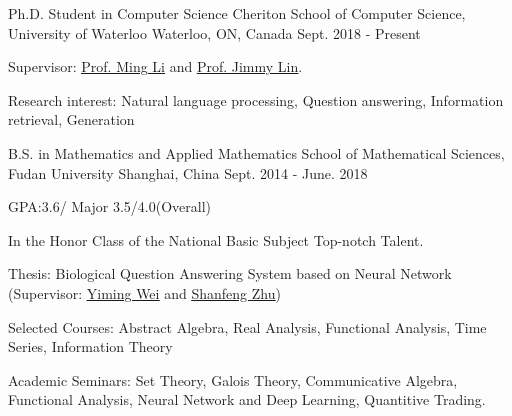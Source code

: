 

\begin{cventries}

 \cventry
    {Ph.D. Student in Computer Science} %
    {Cheriton School of Computer Science, University of Waterloo} %
    {Waterloo, ON, Canada} %
    {Sept. 2018 - Present} %
    {
      \begin{cvitems} %
        \item {Supervisor: {\href{https://cs.uwaterloo.ca/~mli/}{\underline{Prof. Ming Li}}} and {\href{https://cs.uwaterloo.ca/~jimmylin/}{\underline{Prof. Jimmy Lin}}}.}
        \item {Research interest: Natural language processing, Question answering, Information retrieval, Generation }
      \end{cvitems}
    }
      \cventry
    {B.S. in Mathematics and Applied Mathematics} %
    {School of Mathematical Sciences, Fudan University} %
    {Shanghai, China} %
    {Sept. 2014 - June. 2018} %
    {
      \begin{cvitems} %
      \item{GPA:3.6/ Major 3.5/4.0(Overall)}
      \item {In the Honor Class of the National Basic Subject Top-notch Talent.}
      \item{Thesis: Biological Question Answering System based on Neural Network (Supervisor: {\href{http://math.fudan.edu.cn/en/Data/View/222}{\underline{Yiming Wei}}} and {\href{https://dblp.org/pers/hd/z/Zhu:Shanfeng}{\underline{Shanfeng Zhu}}})}
      \item{Selected Courses: Abstract Algebra, Real Analysis, Functional Analysis, Time Series, Information Theory}
      \item{Academic Seminars: Set Theory, Galois Theory, Communicative Algebra, Functional Analysis, Neural Network and Deep Learning, Quantitive Trading.}
      \end{cvitems}
    }

\end{cventries}
